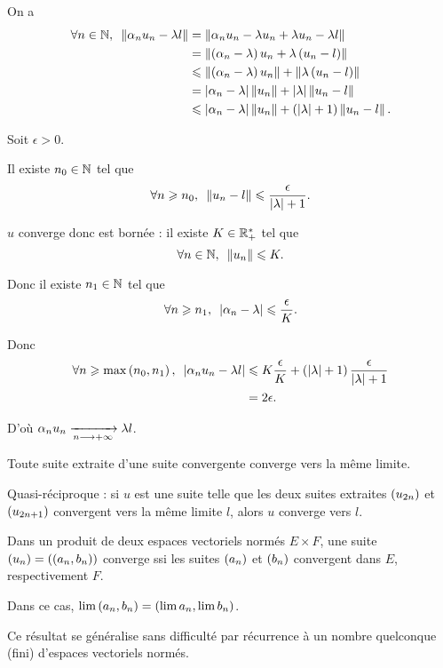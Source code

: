 \begin{dem}
On a \[\begin{aligned}
\quantifs{\forall n\in\N}\norme{\alpha_nu_n-\lambda l}&=\norme{\alpha_nu_n-\lambda u_n+\lambda u_n-\lambda l} \\
&=\norme{\paren{\alpha_n-\lambda}u_n+\lambda\paren{u_n-l}} \\
&\leq\norme{\paren{\alpha_n-\lambda}u_n}+\norme{\lambda\paren{u_n-l}} \\
&=\abs{\alpha_n-\lambda}\norme{u_n}+\abs{\lambda}\norme{u_n-l} \\
&\leq\abs{\alpha_n-\lambda}\norme{u_n}+\paren{\abs{\lambda}+1}\norme{u_n-l}.
\end{aligned}\]

Soit \(\epsilon>0\).

Il existe \(n_0\in\mathbb{N}\) tel que \[\quantifs{\forall n\geq n_0}\norme{u_n-l}\leq\dfrac{\epsilon}{\abs{\lambda}+1}.\]

\(u\) converge donc est bornée : il existe \(K\in\mathbb{R}_+^*\) tel que \[\quantifs{\forall n\in\N}\norme{u_n}\leq K.\]

Donc il existe \(n_1\in\mathbb{N}\) tel que \[\quantifs{\forall n\geq n_1}\abs{\alpha_n-\lambda}\leq\dfrac{\epsilon}{K}.\]

Donc \[\begin{aligned}
\quantifs{\forall n\geq\max\paren{n_0,n_1}}\abs{\alpha_nu_n-\lambda l}&\leq K\dfrac{\epsilon}{K}+\paren{\abs{\lambda}+1}\dfrac{\epsilon}{\abs{\lambda}+1} \\
&=2\epsilon.
\end{aligned}\]

D'où \(\alpha_nu_n\xrightarrow[n\longrightarrow+\infty]{}\lambda l\).
\end{dem}

\begin{prop}
Toute suite extraite d'une suite convergente converge vers la même limite.

Quasi-réciproque : si \(u\) est une suite telle que les deux suites extraites \(\left(u_{2n}\right)\) et \(\left(u_{2n+1}\right)\) convergent vers la même limite \(l\), alors \(u\) converge vers \(l\).
\end{prop}

\begin{prop}
Dans un produit de deux espaces vectoriels normés \(E\times F\), une suite \(\left(u_n\right)=\left(\left(a_n,b_n\right)\right)\) converge ssi les suites \(\left(a_n\right)\) et \(\left(b_n\right)\) convergent dans \(E\), respectivement \(F\).

Dans ce cas, \(\lim\left(a_n,b_n\right)=\left(\lim a_n,\lim b_n\right)\).

Ce résultat se généralise sans difficulté par récurrence à un nombre quelconque (fini) d'espaces vectoriels normés.
\end{prop}

